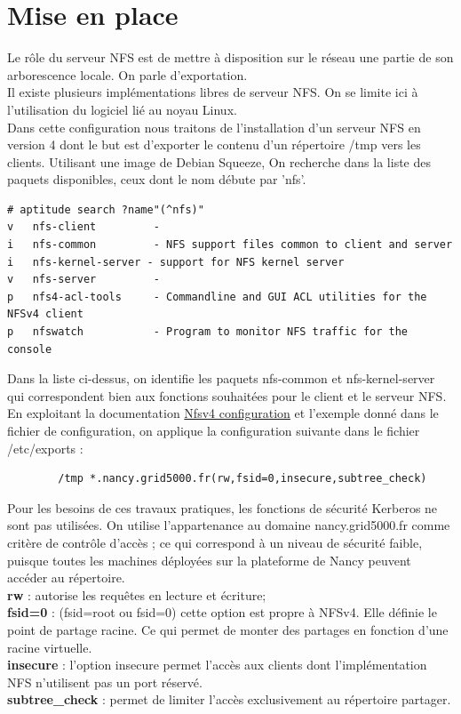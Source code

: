 \documentclass[12pt]{report}
\begin{document}
    \section{Mise en place}
Le rôle du serveur NFS est de mettre à disposition sur le réseau une partie de son arborescence locale. On parle d'\og exportation\fg.\\
Il existe plusieurs implémentations libres de serveur NFS. On se limite ici à l'utilisation du logiciel lié au noyau Linux.\\
Dans cette configuration nous traitons de l'installation d'un serveur NFS en version 4 dont le but est d'exporter le contenu d'un répertoire /tmp vers les clients.
Utilisant une image de Debian Squeeze, On recherche dans la liste des paquets disponibles, ceux dont le nom débute par 'nfs'.
\begin{lstlisting}
# aptitude search ?name"(^nfs)"
v   nfs-client         -
i   nfs-common         - NFS support files common to client and server
i   nfs-kernel-server - support for NFS kernel server
v   nfs-server         -
p   nfs4-acl-tools     - Commandline and GUI ACL utilities for the NFSv4 client
p   nfswatch           - Program to monitor NFS traffic for the console
	  \end{lstlisting}
Dans la liste ci-dessus, on identifie les paquets nfs-common et nfs-kernel-server qui correspondent bien aux fonctions souhaitées pour le client et le serveur NFS.
En exploitant la documentation \href{https://wiki.linux-nfs.org/wiki/index.php/Nfsv4_configuration_fr}{Nfsv4 configuration} et l'exemple donné dans le fichier de configuration, on applique la configuration suivante dans le fichier /etc/exports :
    \begin{lstlisting}
	    /tmp *.nancy.grid5000.fr(rw,fsid=0,insecure,subtree_check)
	  \end{lstlisting}
Pour les besoins de ces travaux pratiques, les fonctions de sécurité Kerberos ne sont pas utilisées. On utilise l'appartenance au domaine nancy.grid5000.fr comme critère de contrôle d'accès ; ce qui correspond à un niveau de sécurité faible, puisque toutes les machines déployées sur la plateforme de Nancy peuvent accéder au répertoire.\\
	  \textbf{rw }: autorise les requêtes en lecture et écriture;\\
	  \textbf{fsid=0} : (fsid=root ou fsid=0) cette option est propre à NFSv4. Elle définie le point de partage racine. Ce qui permet de monter des partages en fonction d'une racine virtuelle.\\
	  \textbf{insecure} : l'option insecure permet l'accès aux clients dont l'implémentation NFS n'utilisent pas un port réservé.\\
	  \textbf{subtree\_check} : permet de limiter l'accès exclusivement au répertoire partager.\\
	  
\end{document}

